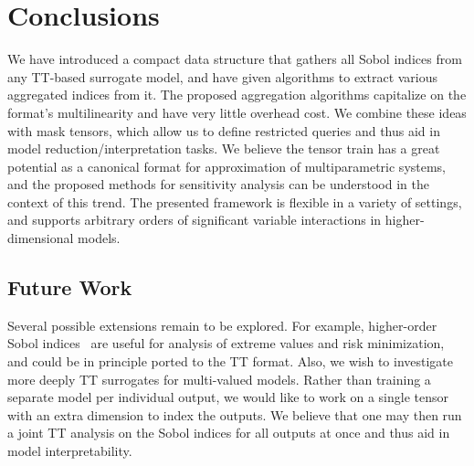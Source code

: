 \documentclass[review, twocolumn]{svjour3}          %
\begin{document}
\section{Conclusions}

We have introduced a compact data structure that gathers all Sobol indices from any TT-based surrogate model, and have given algorithms to extract various aggregated indices from it. The proposed aggregation algorithms capitalize on the format's multilinearity and have very little overhead cost. We combine these ideas with mask tensors, which allow us to define restricted queries and thus aid in model reduction/interpretation tasks. We believe the tensor train has a great potential as a canonical format for approximation of multiparametric systems, and the proposed methods for sensitivity analysis can be understood in the context of this trend. The presented framework is flexible in a variety of settings, and supports arbitrary orders of significant variable interactions in higher-dimensional models.

\subsection{Future Work}

Several possible extensions remain to be explored. For example, higher-order Sobol indices~\cite{ODC:14, GCAI:16} are useful for analysis of extreme values and risk minimization, and could be in principle ported to the TT format. Also, we wish to investigate more deeply TT surrogates for multi-valued models. Rather than training a separate model per individual output, we would like to work on a single tensor with an extra dimension to index the outputs. We believe that one may then run a joint TT analysis on the Sobol indices for all outputs at once and thus aid in model interpretability.

\end{document}

